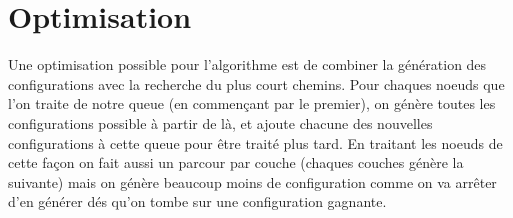 \documentclass[10pt, a4paper]{article}
\begin{document}



\section{Optimisation}
Une optimisation possible pour l'algorithme est de combiner la génération des
configurations avec la recherche du plus court chemins. Pour chaques noeuds que
l'on traite de notre queue (en commençant par le premier), on génère toutes les
configurations possible à partir de là, et ajoute chacune des nouvelles
configurations à cette queue pour être traité plus tard. En traitant les noeuds
de cette façon on fait aussi un parcour par couche (chaques couches génère la
suivante) mais on génère beaucoup moins de configuration comme on va arrêter
d'en générer dés qu'on tombe sur une configuration gagnante.
\end{document}
